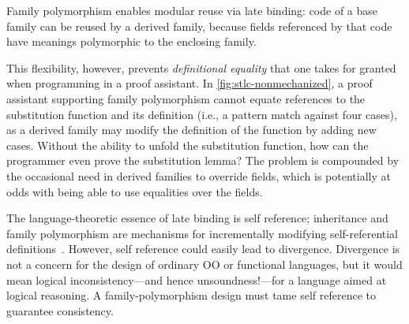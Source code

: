 
Family polymorphism enables modular reuse via late binding:
code of a base family can be reused by a derived family,
because fields referenced by that code have meanings polymorphic to the
enclosing family.

This flexibility, however, prevents \emph{definitional equality}
that one takes for granted when programming in a proof assistant.
In \cref{fig:stlc-nonmechanized}, a proof assistant supporting family
polymorphism cannot equate references to the substitution function and
its definition (i.e., a pattern match against four cases),
as a derived family may modify the definition of the function by adding
new cases.
Without the ability to unfold the substitution function, how can the
programmer even prove the substitution lemma?
%
The problem is compounded by the occasional need in derived families to override fields,
which is potentially at odds with being able to use equalities over the fields.



The language-theoretic essence of late binding is self reference;
inheritance and family polymorphism are mechanisms for
incrementally modifying self-referential definitions~\cite{cook1990inheritance}.
However, self reference could easily lead to divergence.
Divergence is not a concern for the design of ordinary OO or
functional languages, but it would mean logical inconsistency---and
hence unsoundness!---for a language aimed at logical reasoning.
A family-polymorphism design must tame self reference to guarantee consistency.

